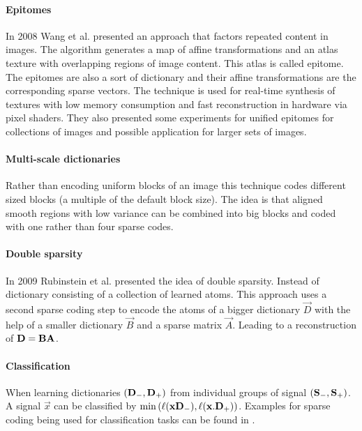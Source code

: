 \paragraph{Epitomes} In 2008 Wang et al.\cite{Wang2008a} presented
an approach that factors repeated content in images. The algorithm generates 
a map of affine transformations and an atlas texture with overlapping
regions of image content. This atlas is called epitome. The epitomes are also a
sort of dictionary and their affine transformations are
the corresponding sparse vectors. The technique is used for real-time synthesis
of textures with low memory consumption and fast reconstruction in hardware via
pixel shaders. They also presented some experiments for unified epitomes for
collections of images and possible application for larger sets of images. 

\paragraph{Multi-scale dictionaries}
Rather than encoding uniform blocks of an image this technique
codes different sized blocks (a multiple of the default block size). The
idea is that aligned smooth regions with low variance can be combined into big
blocks and coded with one rather than four sparse codes\cite{Mairal2007}.

\paragraph{Double sparsity}
In 2009 Rubinstein et al.\cite{Rubinstein2009} presented the idea of double
sparsity. Instead of dictionary consisting  of a collection of
learned atoms. This approach uses a second sparse coding step to encode
the atoms of a bigger dictionary $\vec{D}$ with the help of a smaller
dictionary $\vec{B}$ and a sparse matrix $\vec{A}$. Leading to a reconstruction
of $\boldsymbol{\mathrm{D}}=\boldsymbol{\mathrm{B}}\boldsymbol{\mathrm{A}}$. 

\paragraph{Classification} When learning dictionaries
$(\boldsymbol{\mathrm{D}}_{-},\boldsymbol{\mathrm{D}}_{+})$ from individual groups of signal
$(\boldsymbol{\mathrm{S}}_{-},\boldsymbol{\mathrm{S}}_{+})$. A signal $\vec{x}$ can be classified
by $\min \left( \ell(\boldsymbol{\mathrm{x}}\boldsymbol{\mathrm{D}}_{-}),\ell(\boldsymbol{\mathrm{x}}.\boldsymbol{\mathrm{D}}_{+}) \right)$.
Examples for sparse coding being used for classification tasks can be found in
\cite{Grosse2007,Mairal2008,Mairal2008b,Bar2009}.

